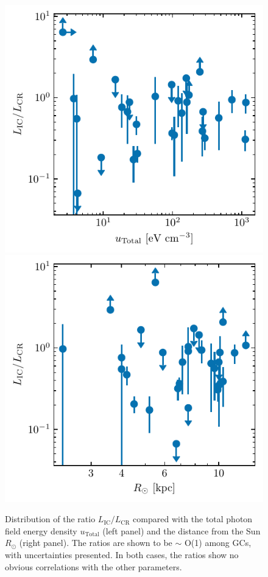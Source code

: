\documentclass[doublespace,draft,nopageskip]{VTthesis} %
\begin{document}
\begin{appendices}
\begin{figure}
    \centering
    \includegraphics{Figures/Globular/ratio_urad.pdf}
    \includegraphics{Figures/Globular/ratio_Rsun.pdf}
    \caption{Distribution of the ratio $L_\mathrm{IC}/L_\mathrm{CR}$ compared with the total photon field energy density $u_\mathrm{Total}$ (left panel) and the distance from the Sun $R_\odot$ (right panel). The ratios are shown to be $\sim$ O(1) among GCs, with uncertainties presented. In both cases, the ratios show no obvious correlations with the other parameters.}
    \label{fig:fe}
\end{figure}
  

\end{appendices}
\end{document}
